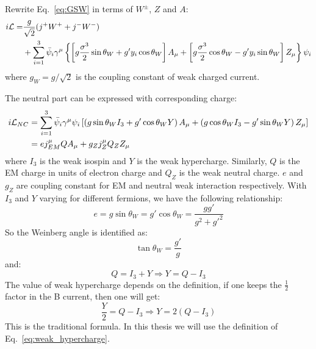 Rewrite Eq.~\ref{eq:GSW} in terms of $W^\pm$, $Z$ and $A$:
\begin{equation}
    \begin{aligned}
	i\mathcal{L} = &\frac{g}{\sqrt{2}}(j^+W^+ + j^-W^-)	\\
	    &+ \sum_{i=1}^3\bar{\psi}_i\gamma^\mu \left\{ 
		\left[g\frac{\sigma^3}{2}\sin\theta_W + g'y_i\cos\theta_W\right] A_\mu
		+ \left[ g\frac{\sigma^3}{2}\cos\theta_W - g'y_i\sin\theta_W \right] Z_\mu 
	    \right\} \psi_i
    \end{aligned}
\end{equation}
where $g_W = g/\sqrt{2}$ is the coupling constant of weak charged current.

The neutral part can be expressed with corresponding charge:
\begin{equation}
    \begin{aligned}
	i\mathcal{L}_{NC} &= \sum_{i=1}^{3} \bar{\psi}_i\gamma^\mu\psi_i
	\left[ 
	    \left(g\sin\theta_W I_3 + g'\cos\theta_W Y \right) A_\mu 
	    + \left(g\cos\theta_W I_3 - g'\sin\theta_W Y \right) Z_\mu 
	\right]	\\
	&= ej^\mu_{EM}QA_\mu + g_Zj^\mu_Z Q_Z Z_\mu \\
    \end{aligned}
\end{equation}
where $I_3$ is the weak isospin and $Y$ is the weak hypercharge. Similarly, $Q$ is
the EM charge in units of electron charge and $Q_Z$ is the weak neutral charge.
$e$ and $g_Z$ are coupling constant for EM and neutral weak interaction respectively.
With $I_3$ and $Y$ varying for different fermions, we have the following relationship:
\begin{equation}
    e = g\sin\theta_W = g'\cos\theta_W = \frac{gg'}{g^2 + g'^2}
\end{equation}
So the Weinberg angle is identified as:
\begin{equation}
    \tan\theta_W = \frac{g'}{g}
\end{equation}
and: 
\begin{equation}
    Q = I_3 + Y	\Longrightarrow Y = Q - I_3
    \label{eq:weak_hypercharge}
\end{equation}
The value of weak hypercharge depends on the definition, if one keeps the $\frac{1}{2}$
factor in the B current, then one will get:
\begin{equation}
    \frac{Y}{2} = Q - I_3   \Rightarrow Y = 2(Q-I_3)
\end{equation}
This is the traditional formula.
In this thesis we will use the definition of Eq.~\ref{eq:weak_hypercharge}.

